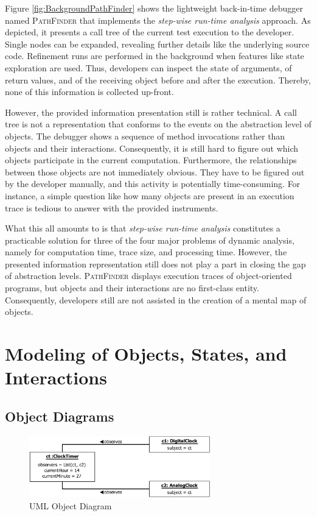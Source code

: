 Figure \ref{fig:BackgroundPathFinder} shows the lightweight back-in-time debugger named \textsc{PathFinder} that implements the \emph{step-wise run-time analysis} approach.
As depicted, it presents a call tree of the current test execution to the developer.
Single nodes can be expanded, revealing further details like the underlying source code.
Refinement runs are performed in the background when features like state exploration are used.
Thus, developers can inspect the state of arguments, of return values, and of the receiving object before and after the execution.
Thereby, none of this information is collected up-front.

However, the provided information presentation still is rather technical.
A call tree is not a representation that conforms to the events on the abstraction level of objects.
The debugger shows a sequence of method invocations rather than objects and their interactions.
Consequently, it is still hard to figure out which objects participate in the current computation.
Furthermore, the relationships between those objects are not immediately obvious.
They have to be figured out by the developer manually, and this activity is potentially time-consuming.
For instance, a simple question like how many objects are present in an execution trace is tedious to answer with the provided instruments.

What this all amounts to is that \emph{step-wise run-time analysis} constitutes a practicable solution for three of the four major problems of dynamic analysis, namely for computation time, trace size, and processing time.
However, the presented information representation still does not play a part in closing the gap of abstraction levels.
\textsc{PathFinder} displays execution traces of object-oriented programs, but objects and their interactions are no first-class entity.
Consequently, developers still are not assisted in the creation of a mental map of objects.

\section{Modeling of Objects, States, and Interactions}
\label{s:BackgroundModeling}

\subsection{Object Diagrams}
\label{ss:BackgroundModelingObject}

\begin{figure}
	\centering
	\includegraphics[width=0.7\textwidth]{../images/02-Object}
	\caption[TOC Caption]{UML Object Diagram}
	\label{fig:BackgroundModelingObject}
\end{figure}

